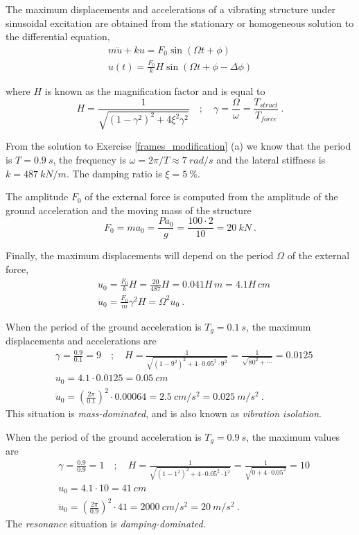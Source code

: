 \begin{Answer}[ref={frame_ground_acceleration}]
The maximum displacements and accelerations of a vibrating structure under sinusoidal excitation are obtained from the stationary or homogeneous solution to the differential equation,
\begin{align*}
m\ddot{u} + ku = F_0\sin(\Omega t + \phi) \\
u(t) = \frac{F_0}{k}H\sin(\Omega t + \phi - \Delta\phi)
\end{align*}

where $H$ is known as the magnification factor and is equal to
$$
H = \frac{1}{\sqrt{(1-\gamma^2)^2 + 4\xi^2\gamma^2}} \quad ; \quad
\gamma = \frac{\Omega}{\omega} = \frac{T_{struct}}{T_{force}}\ .
$$

From the solution to Exercise \ref{frames_modification} (a) we know that the period is $T=\SI{0.9}{s}$, the frequency is $\omega = 2\pi/T \approx \SI{7}{rad/s}$ and the lateral stiffness is $k=\SI{487}{kN/m}$. The damping ratio is $\xi=\SI{5}{\%}$.

The amplitude $F_0$ of the external force is computed from the amplitude of the ground acceleration and the moving mass of the structure
$$
F_0 = ma_{0} = \frac{Pa_0}{g} = \frac{100\cdot2}{10} = \SI{20}{kN}\ .
$$

Finally, the maximum displacements will depend on the period $\Omega$ of the external force,
\begin{align*}
&u_0 = \frac{F_0}{k}H = \frac{20}{487}H = 0.041H\,\si{m} = 4.1H\,\si{cm} \\
&\ddot{u}_0 = \frac{F_0}{m}\gamma^2H = \Omega^2u_0\ .
\end{align*}


When the period of the ground acceleration is $T_g=\SI{0.1}{s}$, the maximum displacements and accelerations are
\begin{align*}
&\gamma = \frac{0.9}{0.1} = 9 \quad ; \quad
H = \frac{1}{\sqrt{(1-9^2)^2 + 4\cdot 0.05^2\cdot 9^2}} = \frac{1}{\sqrt{80^2 + \cdots}} = 0.0125 \\
&u_0 = 4.1\cdot 0.0125 = \SI{0.05}{cm} \\
&\ddot{u}_0 = \left(\frac{2\pi}{0.1}\right)^2 \cdot 0.00064 = \SI{2.5}{cm/s^2} = \SI{0.025}{m/s^2}\ .
\end{align*}
This situation is \emph{mass-dominated}, and is also known as \emph{vibration isolation}.

When the period of the ground acceleration is $T_g=\SI{0.9}{s}$, the maximum values are
\begin{align*}
&\gamma = \frac{0.9}{0.9} = 1 \quad ; \quad
H = \frac{1}{\sqrt{(1-1^2)^2 + 4\cdot 0.05^2\cdot 1^2}} = \frac{1}{\sqrt{0 + 4\cdot 0.05^2}} = 10 \\
&u_0 = 4.1\cdot 10 = \SI{41}{cm} \\
&\ddot{u}_0 = \left(\frac{2\pi}{0.9}\right)^2 \cdot 41 = \SI{2000}{cm/s^2} = \SI{20}{m/s^2}\ .
\end{align*}
The \emph{resonance} situation is \emph{damping-dominated}.


\end{Answer}

